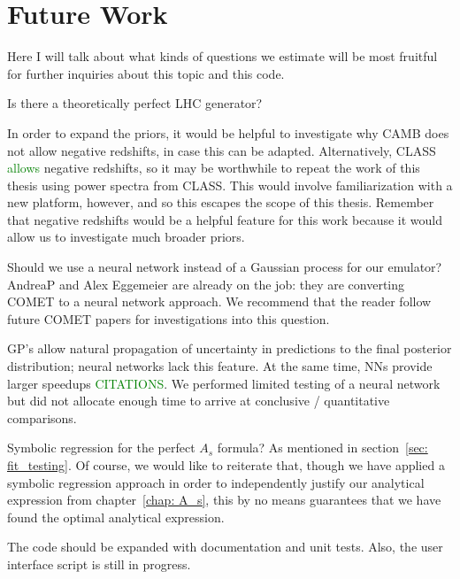 \section{Future Work}
\label{sec: future_work}

Here I will talk about what kinds of questions we estimate will be most 
fruitful for further inquiries about this topic and this code.


Is there a theoretically perfect LHC generator?


In order to expand the priors, it would be helpful to investigate why CAMB 
does not allow negative redshifts, in case this can be adapted. Alternatively, 
CLASS \textcolor{green}{allows} negative redshifts, so it may be worthwhile to 
repeat the work of this thesis using power spectra from CLASS. This would 
involve familiarization with a new platform, however, and so this escapes the 
scope of this thesis. Remember that negative redshifts would be a helpful 
feature for this work because it would allow us to investigate much broader 
priors.


Should we use a neural network instead of a Gaussian process for our emulator? 
AndreaP and Alex Eggemeier are already on the job: they are converting COMET 
to a neural network approach. We recommend that the reader follow future COMET 
papers for investigations into this question.

GP's allow natural propagation of
uncertainty in predictions to the final posterior distribution; neural
networks lack this feature. At the same time, NNs provide larger speedups 
\textcolor{green}{CITATIONS}. We performed limited testing of a neural network
but did not allocate enough time to arrive at conclusive / quantitative
comparisons.

Symbolic regression for the perfect $A_s$ formula?
As mentioned in section~\ref{sec: fit_testing}.
Of course, we would 
like to reiterate that, though we have applied a symbolic regression approach 
in order to independently justify our analytical expression from
chapter~\ref{chap: A_s}, this by no means guarantees that we have found the 
optimal analytical expression.


The code should be expanded with documentation and unit tests. Also, the
user interface script is still in progress.

